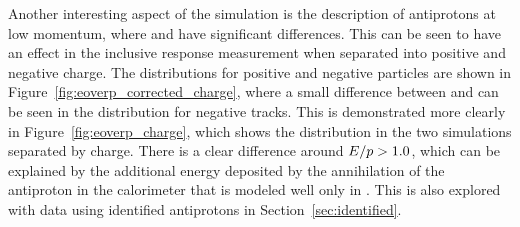 Another interesting aspect of the simulation is the description of antiprotons at low momentum, where \QGSP and \FTFP have significant differences.
This can be seen to have an effect in the inclusive response measurement when separated into positive and negative charge.
The \epcor distributions for positive and negative particles are shown in Figure~\ref{fig:eoverp_corrected_charge}, where a small difference between \QGSP and \FTFP can be seen in the distribution for negative tracks.
This is demonstrated more clearly in Figure~\ref{fig:eoverp_charge}, which shows the \ep distribution in the two simulations separated by charge.
There is a clear difference around $E/p > 1.0$, which can be explained by the additional energy deposited by the annihilation of the antiproton in the calorimeter that is modeled well only in \FTFP.
This is also explored with data using identified antiprotons in Section~\ref{sec:identified}. 

